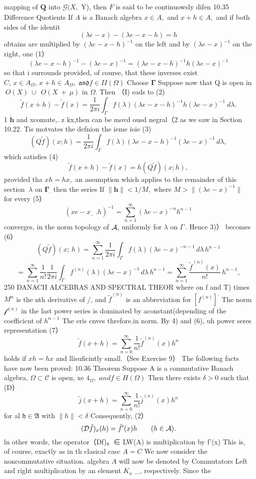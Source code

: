 mapping of $\underline{{\mathbf{Q}}}$ into ${\mathcal{G}}(X,$ Y), then ${\mathbf{}}F$ is said to be continuowsly difen 10.35 Difference Quotients If $\scriptstyle A$ is a Banach algebra $x\in A,$ and $x+h\in A,$ and if both sides of the identit $$ (\lambda e-x)-(\lambda e-x-h)=h $$ obtains are multiplied by $(\lambda e-x-h)^{-1}$ on the left and by $(\lambda e-x)^{-1}$ on the right, one (1） $$ (\lambda e-x-h)^{-1}-(\lambda e-x)^{-1}=(\lambda e-x-h)^{-1}h(\lambda e-x)^{-1} $$ so that i surrounds provided, of course, that these inverses exist $C,\,x\in A_{\Omega},\,x+h\in A_{\Omega},$ ${\mathfrak{a n d}}f\in I I(\Omega)$ Choose ${\boldsymbol{\Gamma}}$ Suppose now that Q is open in $\ O(X)\ \cup\ \ O(X\ +\ \mu)$ in $\Omega.$ Then （I) eads to (2) $$ \tilde{f}(x+h)-\tilde{f}(x)=\frac{1}{2\pi i}\int_{\Gamma}f(\lambda)(\lambda e-x-h)^{-1}h(\lambda e-x)^{-1}~d\lambda. $$ 1 $\dot{\boldsymbol{h}}$ and xcomute,. z kx,then can be movd ousd negral（2 as we saw in Section 10.22. Tis motvates the defnion the ieme ioie (3) $$ (Q{\tilde{f}})(x;h)={\frac{1}{2\pi i}}\int_{\Gamma}f(\lambda)(\lambda e-x-h)^{-1}(\lambda e-x)^{-1}\,d\lambda, $$ which satisfies (4) $$ \tilde{f}(x+h)-\tilde{f}(x)=h(Q\tilde{f})(x;h), $$ provided tha $x h=h x,$ an assumption which applies to the remainder of this section $\ \lambda$ on ${\boldsymbol{\Gamma}}_{\cdot}$ then the series If $\|{\boldsymbol{h}}\|<1/M,$ where $M>\|(\lambda e-x)^{-1}\|$ for every (5） $$ \left(\dot{x}e-x_{..}^{\phantom{a b}}.h\right)^{-1}=\sum_{n=1}^{\infty}\left(\lambda e-x\right)^{-n}h^{n-1} $$ converges, in the norm topology of ${\cal A},$ uniformly for $\lambda$ on $\textstyle\Gamma\,.$ Hence 3)） becomes (6） $$ (Q\widetilde{f})(x;\,h)=\sum_{n=1}^{\infty}\frac{1}{2\pi i}\int_{\Gamma}f(\lambda)(\lambda e-x)^{-n-1}\,d\lambda\,h^{n-1} $$ $$ =\sum_{n=1}^{\infty}\frac{1}{n!}\frac{1}{2\pi i}\int_{\Gamma}f^{(n)}(\lambda)(\lambda e-x)^{-1}\,d\lambda\,h^{n-1}=\sum_{n=1}^{\infty}\frac{\tilde{f}^{(n)}(x)}{n!}\,h^{n-1}, $$250 DANACII ALCEBRAS AND SPECTRAL THEOR where on f and T) times $M^{n}$ is the nth derivative of /, and ${\tilde{f}}^{(n)}$ is an abbreviation for $\left[f^{(n)}\right]^{.}$ The norm ${\mathcal{f}}^{(n)}$ in the last power series is dominated by aconstant(depending of the coefficicnt of $h^{n-1}$ The eris cnves threfore.in norm. By 4) and (6), uh power seres representation (7） $$ \tilde{f}(x+h)=\sum_{n=0}^{\infty}\frac{1}{n!}\tilde{f}^{(n)}(x)h^{n} $$ holds if $x h=h x$ and llisuficintly small.（See Exercise 9） The following facts have now been proved: 10.36 Theorem Suppose A is a commutative Banach algebra, $\Omega\subset{\mathcal{C}}$ is open, xe $4_{\Omega},$ $a n d f\in H(\Omega)$ Then there exists $\delta>0$ such that (D） $$ \tilde{j}(x+h)=\sum_{n=0}^{\infty}\frac{1}{n!}\tilde{j}^{(n)}(x)h^{n} $$ for al ${\mathfrak{h}}\in{\mathfrak{A}}$ with $\|h\|<\delta$ Consequently, (2） $$ ({\cal D}{\tilde{f}})_{x}(h)={\tilde{f}}^{\prime}(x)h\qquad(h\in{\cal A}). $$ ln other words, the operator（Df)。∈ LW(A) is multiplication by f'(x) This is, of course, exactly as in th clasical casc $A=C$ We now consider the noncommutative situation. algebra $\scriptstyle A$ will now be denoted by Commutators Left and right multiplication by an element $\textstyle K_{x}$ _, respectively. Since the 